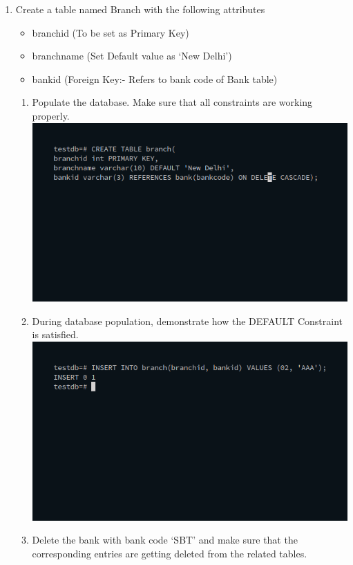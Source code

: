 \documentclass[10pt,a4paper,titlepage]{report}
\begin{document}
{\begin{enumerate}
\begin{enumerate}
	\item Create a table named Branch with the following attributes
		\begin{itemize}
			\item branchid (To be set as Primary Key)
			\item branchname (Set Default value as ‘New Delhi’)
			\item bankid (Foreign Key:- Refers to bank code of Bank table)
		\end{itemize}
		\begin{enumerate}
			\item Populate the database. Make sure that all constraints are working properly.\newline
			\includegraphics[width=\linewidth]{../Images/Constraints/11.png}\newline
			\item During database population, demonstrate how the DEFAULT Constraint is satisfied.\newline
			\includegraphics[width=\linewidth]{../Images/Constraints/12.png}\newline
			\item Delete the bank with bank code ‘SBT’ and make sure that the corresponding entries are getting deleted from the related tables.\newline

\end{enumerate}
\end{enumerate}
\end{enumerate}}
\end{document}
